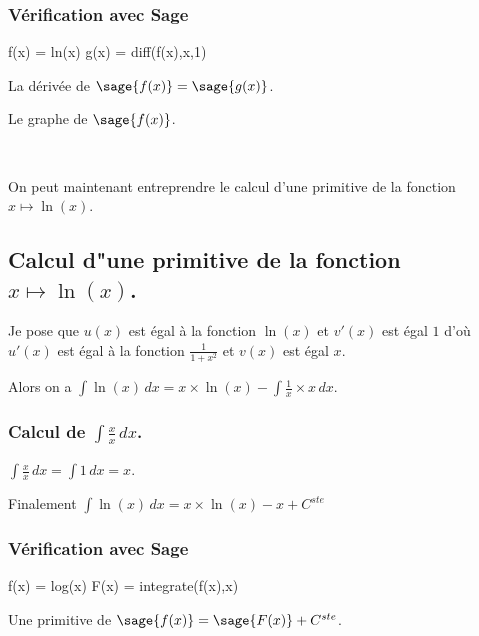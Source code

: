 \documentclass[a4paper,12pt]{report}
\begin{document}
\subsubsection{Vérification avec Sage}

\begin{sageblock}
    f(x) = ln(x)
    g(x) = diff(f(x),x,1)
\end{sageblock}

La dérivée de $\sage{f(x)} = \sage{g(x)} $.

Le graphe de $\sage{f(x)} $.


\begin{center}
 \\
\end{center}







On peut maintenant entreprendre le calcul d'une primitive de la  fonction  $x \mapsto \ln(x) $.






\subsection{Calcul d"une primitive de la fonction  $x \mapsto \ln(x) $.}


Je pose que $u(x)$  est égal à la fonction $\ln(x)$ et $v'(x)$ est égal $1$  d'où $u'(x)$  est égal à la fonction $ \frac{1}{1+ x^2} $ et $v(x)$ est égal $x$.

Alors on a $\int \ln(x) \, dx = x \times \ln(x) -\int \frac{1}{x} \times x \, dx $.


\subsubsection{Calcul de $\int \frac{x}{x} \, dx $.}

$\int \frac{x}{x} \, dx = \int 1 \, dx = x$.


Finalement $\int \ln(x) \, dx = x \times \ln(x) -x + C^{ste} $

\subsubsection{Vérification avec Sage}

\begin{sageblock}
    f(x) = log(x)
    F(x) = integrate(f(x),x)
\end{sageblock}

Une primitive de $\sage{f(x)} = \sage{F(x)} + C^{ste} $.
\end{document}
